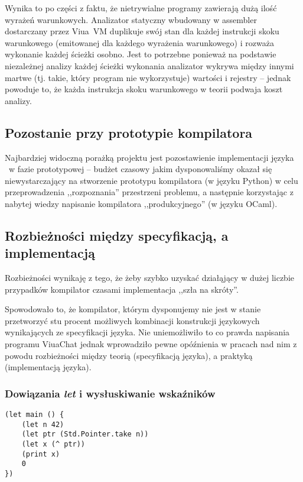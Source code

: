 Wynika to po części z faktu, że nietrywialne programy zawierają dużą ilość
wyrażeń warunkowych. Analizator statyczny wbudowany w assembler dostarczany
przez Viua~VM duplikuje swój stan dla każdej instrukcji skoku warunkowego
(emitowanej dla każdego wyrażenia warunkowego) i rozważa wykonanie każdej
ścieżki osobno.
Jest to potrzebne ponieważ na podstawie niezależnej analizy każdej ścieżki
wykonania analizator wykrywa między innymi martwe (tj. takie, który program nie
wykorzystuje) wartości i rejestry -- jednak powoduje to, że każda instrukcja
skoku warunkowego w teorii podwaja koszt analizy.

\subsection{Pozostanie przy prototypie kompilatora}

Najbardziej widoczną porażką projektu jest pozostawienie implementacji języka
\ViuAct\ w fazie prototypowej -- budżet czasowy jakim dysponowaliśmy okazał się
niewystarczający na stworzenie prototypu kompilatora (w języku Python) w celu
przeprowadzenia ,,rozpoznania'' przestrzeni problemu, a następnie korzystając z
nabytej wiedzy napisanie kompilatora ,,produkcyjnego'' (w języku OCaml).

\subsection{Rozbieżności między specyfikacją, a implementacją}

Rozbieżności wynikaję z tego, że żeby szybko uzyskać działąjący w dużej liczbie
przypadków kompilator czasami implementacja ,,szła na skróty''.

Spowodowało to, że kompilator, którym dysponujemy nie jest w stanie przetworzyć
stu procent możliwych kombinacji konstrukcji językowych wynikających ze
specyfikacji języka. Nie uniemożliwiło to co prawda napisania programu ViuaChat
jednak wprowadziło pewne opóźnienia w pracach nad nim z powodu rozbieżności
między teorią (specyfikacją języka), a praktyką (implementacją języka).

\subsubsection*{Dowiązania \emph{let} i wysłuskiwanie wskaźników}

\begin{lstlisting}[caption={Błędnie działający przykład dowiązania do wyłuskania}]
(let main () {
    (let n 42)
    (let ptr (Std.Pointer.take n))
    (let x (^ ptr))
    (print x)
    0
})
\end{lstlisting}

